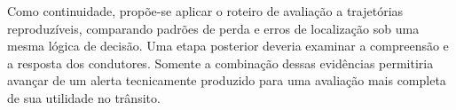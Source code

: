 \documentclass[conference,a4paper]{IEEEtran}
\begin{document}
Como continuidade, propõe-se aplicar o roteiro de avaliação a trajetórias reproduzíveis, comparando padrões de perda e erros de localização sob uma mesma lógica de decisão. Uma etapa posterior deveria examinar a compreensão e a resposta dos condutores. Somente a combinação dessas evidências permitiria avançar de um alerta tecnicamente produzido para uma avaliação mais completa de sua utilidade no trânsito.



\end{document}
